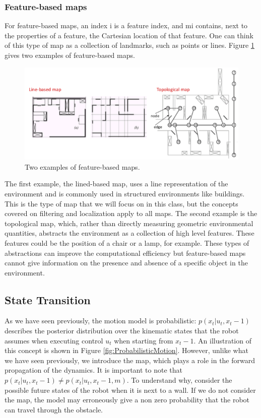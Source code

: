 \documentclass[twoside]{article}
\begin{document}
\subsubsection{Feature-based maps}
For feature-based maps, an index i is a feature index, and mi contains, next to the properties of a feature, the Cartesian location of that feature. One can think of this type of map as a collection of landmarks, such as points or lines. Figure \ref{fig:FeatureBasedMaps} gives two examples of feature-based maps.

\begin{figure}[H]
\centering
\includegraphics[width=.9\linewidth]{FeatureBasedMaps.png}
\caption{Two examples of feature-based maps.}
\label{fig:FeatureBasedMaps}
\end{figure}

The first example, the lined-based map, uses a line representation of the environment and is commonly
used in structured environments like buildings. This is the type of map that we will focus on in this class,
but the concepts covered on filtering and localization apply to all maps.
The second example is the topological map, which, rather than directly measuring geometric environmental
quantities, abstracts the environment as a collection of high level features. These features could be the
position of a chair or a lamp, for example.
These types of abstractions can improve the computational efficiency but feature-based maps cannot give
information on the presence and absence of a specific object in the environment.

\subsection{State Transition}
As we have seen previously, the motion model is probabilistic:
$p(x_t|u_t, x_t-1)$ describes the posterior distribution over the kinematic
states that the robot assumes when executing control $u_t$ when starting
from $x_t-1$. An illustration of this concept is shown in Figure \ref{fig:ProbabilisticMotion}. However, unlike what we have seen previously, we introduce
the map, which plays a role in the forward propagation of the dynamics.
It is important to note that $p(x_t|u_t, x_t-1) \neq p(x_t|u_t, x_t-1, m)$.
To understand why, consider the possible future states of the robot when it is next to a wall. If we do not consider the map, the model may erroneously give a non zero probability that the robot can travel through the obstacle.
\end{document}
